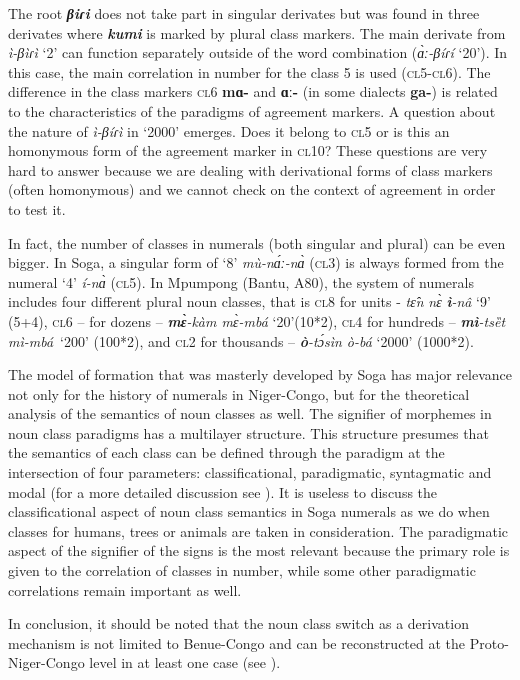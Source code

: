 The root \textbf{\textit{βiɾi}} does not take part in singular derivates but was found in three derivates where \textbf{\textit{kumi}} is marked by plural class markers. The main derivate from \textit{ì-βìɾì} ‘2’ can function separately outside of the word combination (\textit{{\`{ɑ}}ː-βíɾí} ‘20’). In this case, the main correlation in number for the class 5 is used (\textsc{cl}5-\textsc{cl}6). The difference in the class markers \textsc{cl}6 \textbf{mɑ-} and \textbf{ɑː-} (in some dialects \textbf{ga-}) is related to the characteristics of the paradigms of agreement markers. A question about the nature of \textit{ì-βíɾì} in ‘2000’ emerges. Does it belong to \textsc{cl}5 or is this an homonymous form of the agreement marker in \textsc{cl}10? These questions are very hard to answer because we are dealing with derivational forms of class markers (often homonymous) and we cannot check on the context of agreement in order to test it. 

In fact, the number of classes in numerals (both singular and plural) can be even bigger. In Soga, a singular form of `8' \textit{m{\`{u}}-n{\'{ɑ}}ː-n{\`{ɑ}}} (\textsc{cl}3) is always formed from the numeral `4' \textit{í-n{\`{ɑ}}}  (\textsc{cl}5). In Mpumpong (Bantu, A80), the system of numerals includes four different plural noun classes, that is \textsc{cl}8 for units - \textit{t{\^{ɛ}}n} \textit{n{\`{ɛ}}} \textbf{\textit{ì}}\textit{-nâ} ‘9’~ (5+4), \textsc{cl}6 – for dozens – \textbf{\textit{m{\`{ɛ}}}}\textit{-kàm m{\`{ɛ}}-mbá} ‘20’(10*2), \textsc{cl}4  for hundreds – \textbf{\textit{mì}}\textit{-tsȅt mì-mbá}~‘200’ (100*2), and \textsc{cl}2  for thousands – \textbf{\textit{ò}}\textit{-t{\'{ɔ}}sìn ò-bá} ‘2000’ (1000*2).

The model of formation that was masterly developed by Soga has major relevance not only for the history of numerals in Niger-Congo, but for the theoretical analysis of the semantics of noun classes as well. The signifier of morphemes in noun class paradigms has a multilayer structure. This structure presumes that the semantics of each class can be defined through the paradigm at the intersection of four parameters: classificational, paradigmatic, syntagmatic and modal (for a more detailed discussion see \citealt{Pozdniakov2003}). It is useless to discuss the classificational aspect of noun class semantics in Soga numerals as we do when classes for humans, trees or animals are taken in consideration. The paradigmatic aspect of the signifier of the signs is the most relevant because the primary role is given to the correlation of classes in number, while some other paradigmatic correlations remain important as well. 

In conclusion, it should be noted that the noun class switch as a derivation mechanism is not limited to Benue-Congo and can be reconstructed at the Proto-Niger-Congo level in at least one case (see ). 